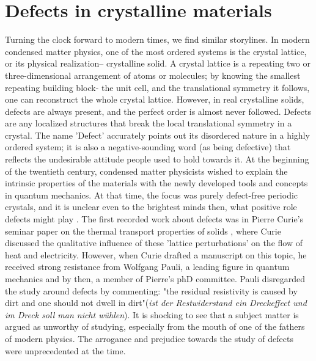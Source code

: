 \section{Defects in crystalline materials}
Turning the clock forward to modern times, we find similar storylines. In modern condensed matter physics, one of the most ordered systems is the crystal lattice, or its physical realization-- crystalline solid. A crystal lattice is a repeating two or three-dimensional arrangement of atoms or molecules; by knowing the smallest repeating building block- the unit cell, and the translational symmetry it follows, one can reconstruct the whole crystal lattice. However, in real crystalline solids, defects are always present, and the perfect order is almost never followed. Defects are any localized structures that break the local translational symmetry in a crystal. The name 'Defect' accurately points out its disordered nature in a highly ordered system; it is also a negative-sounding word (as being defective) that reflects the undesirable attitude people used to hold towards it. At the beginning of the twentieth century, condensed matter physicists wished to explain the intrinsic properties of the materials with the newly developed tools and concepts in quantum mechanics. At that time, the focus was purely defect-free periodic crystals, and it is unclear even to the brightest minds then, what positive role defects might play \cite{lorentzVortrageUberKinetische1914} \cite{spitalerPerspectivesTheoryDefects2018}. The first recorded work about defects was in Pierre Curie's seminar paper on the thermal transport properties of solids \cite{ZurKinetischenTheorie}, where Curie discussed the qualitative influence of these 'lattice perturbations' on the flow of heat and electricity. However, when Curie drafted a manuscript on this topic, he received strong resistance from Wolfgang Pauli, a leading figure in quantum mechanics and by then, a member of Pierre's phD committee. Pauli disregarded the study around defects by commenting: "the residual resistivity is caused by dirt and one should not dwell in dirt"(\textit{ist der Restwiderstand ein Dreckeffect und im Dreck soll man nicht wühlen}). It is shocking to see that a subject matter is argued as unworthy of studying, especially from the mouth of one of the fathers of modern physics. The arrogance and prejudice towards the study of defects were unprecedented at the time.


